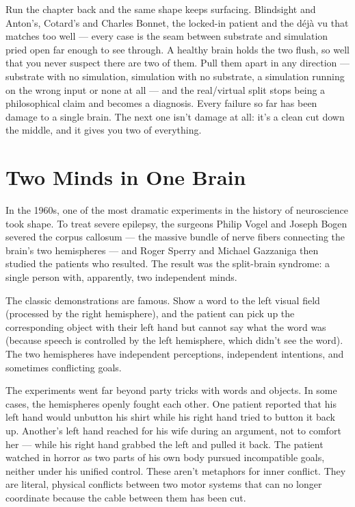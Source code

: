 \documentclass[11pt, twoside, openright]{book}
\begin{document}
Run the chapter back and the same shape keeps surfacing. Blindsight and Anton's, Cotard's and Charles Bonnet, the locked-in patient and the déjà vu that matches too well --- every case is the seam between substrate and simulation pried open far enough to see through. A healthy brain holds the two flush, so well that you never suspect there are two of them. Pull them apart in any direction --- substrate with no simulation, simulation with no substrate, a simulation running on the wrong input or none at all --- and the real/\allowbreak{}virtual split stops being a philosophical claim and becomes a diagnosis. Every failure so far has been damage to a single brain. The next one isn't damage at all: it's a clean cut down the middle, and it gives you two of everything.


\chapter{Two Minds in One Brain}

In the 1960s, one of the most dramatic experiments in the history of neuroscience took shape. To treat severe epilepsy, the surgeons Philip Vogel and Joseph Bogen severed the corpus callosum --- the massive bundle of nerve fibers connecting the brain's two hemispheres --- and Roger Sperry and Michael Gazzaniga then studied the patients who resulted. The result was the split-brain syndrome: a single person with, apparently, two independent minds.

The classic demonstrations are famous. Show a word to the left visual field (processed by the right hemisphere), and the patient can pick up the corresponding object with their left hand but cannot say what the word was (because speech is controlled by the left hemisphere, which didn't see the word). The two hemispheres have independent perceptions, independent intentions, and sometimes conflicting goals.

The experiments went far beyond party tricks with words and objects. In some cases, the hemispheres openly fought each other. One patient reported that his left hand would unbutton his shirt while his right hand tried to button it back up. Another's left hand reached for his wife during an argument, not to comfort her --- while his right hand grabbed the left and pulled it back. The patient watched in horror as two parts of his own body pursued incompatible goals, neither under his unified control. These aren't metaphors for inner conflict. They are literal, physical conflicts between two motor systems that can no longer coordinate because the cable between them has been cut.
\end{document}
